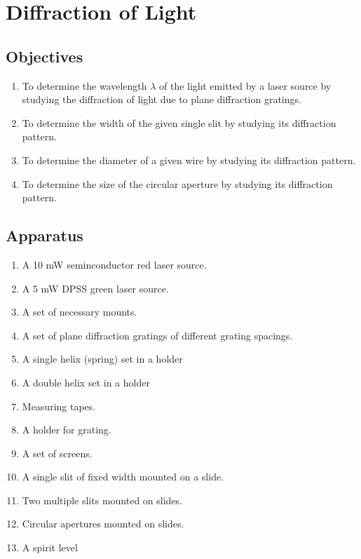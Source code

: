 
\chapter{Diffraction of Light}

\section*{Objectives}

\begin{enumerate}
    \item To determine the wavelength $\lambda$ of the light emitted by a laser source by studying the diffraction of light due to plane diffraction gratings.
    \item To determine the width of the given single slit by studying its diffraction pattern.
    \item To determine the diameter of a given wire by studying its diffraction pattern.
    \item To determine the size of the circular aperture by studying its diffraction pattern.
\end{enumerate}



\section*{Apparatus}

\begin{enumerate}
    \item A 10 mW seminconductor red laser source.
    \item A 5 mW DPSS green laser source.
    \item A set of necessary mounts.
    \item A set of plane diffraction gratings of different grating spacings.
    \item A single helix (spring) set in a holder
    \item A double helix set in a holder
    \item Measuring tapes.
    \item A holder for grating.
    \item A set of screens.  
    \item A single slit of fixed width mounted on a slide.
    \item Two multiple slits mounted on slides.
    \item Circular apertures mounted on slides.
    \item A spirit level
\end{enumerate}

